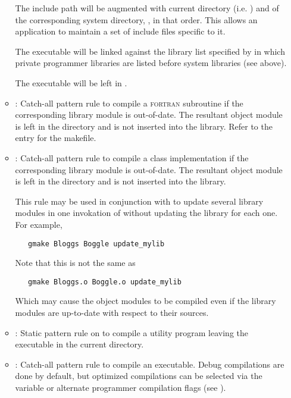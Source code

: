 \begin{itemize}
\begin{itemize}
      The include path will be augmented with current directory (i.e.
      ) and of the corresponding system directory,
      , in that order.  This allows an application to
      maintain a set of include files specific to it.

      The executable will be linked against the library list specified by
       in which private programmer libraries are listed
      before system libraries (see above).

      The executable will be left in .
   \item
      :  Catch-all pattern rule to compile a \textsc{fortran} subroutine
      if the corresponding library module is out-of-date.  The resultant object
      module is left in the  directory and is not inserted
      into the library.  Refer to the entry for the  makefile.
   \item
      :  Catch-all pattern rule to compile a class implementation if
      the corresponding library module is out-of-date.  The resultant object
      module is left in the  directory and is not inserted
      into the library.

      This rule may be used in conjunction with  to update
      several library modules in one invokation of  without
      updating the library for each one.  For example,

\begin{verbatim}
   gmake Bloggs Boggle update_mylib
\end{verbatim}

      \noindent
      Note that this is not the same as

\begin{verbatim}
   gmake Bloggs.o Boggle.o update_mylib
\end{verbatim}

      \noindent
      Which may cause the object modules to be compiled even if the library
      modules are up-to-date with respect to their sources.
   \item
      : Static pattern rule on  to compile a
      utility program leaving the executable in the current directory.
   \item
      : Catch-all pattern rule to compile an executable.  Debug
      compilations are done by default, but optimized compilations can be
      selected via the  variable or alternate programmer compilation
      flags (see ).


\end{itemize}
\end{itemize}
